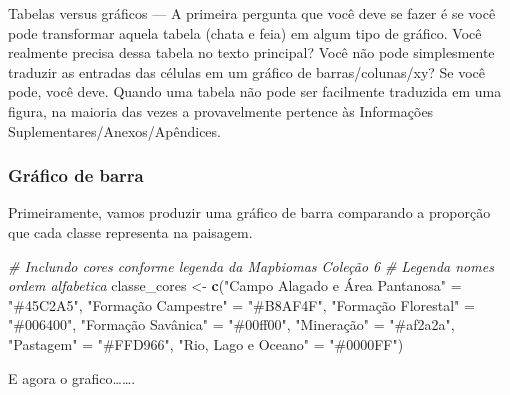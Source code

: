 \documentclass[
]{article}
\newenvironment{Shaded}{\begin{snugshade}}{\end{snugshade}}
\newcommand{\CommentTok}[1]{\textcolor[rgb]{0.56,0.35,0.01}{\textit{#1}}}
\newcommand{\FunctionTok}[1]{\textcolor[rgb]{0.13,0.29,0.53}{\textbf{#1}}}
\newcommand{\NormalTok}[1]{#1}
\newcommand{\OtherTok}[1]{\textcolor[rgb]{0.56,0.35,0.01}{#1}}
\newcommand{\StringTok}[1]{\textcolor[rgb]{0.31,0.60,0.02}{#1}}
\begin{document}
Tabelas versus gráficos --- A primeira pergunta que você deve se fazer
é se você pode transformar aquela tabela (chata e feia) em algum tipo
de gráfico. Você realmente precisa dessa tabela no texto principal?
Você não pode simplesmente traduzir as entradas das células em um
gráfico de barras/colunas/xy? Se você pode, você deve. Quando uma
tabela não pode ser facilmente traduzida em uma figura, na maioria
das vezes a provavelmente pertence às
Informações Suplementares/Anexos/Apêndices.

\hypertarget{gruxe1fico-de-barra}{%
\subsubsection{Gráfico de barra}\label{gruxe1fico-de-barra}}

Primeiramente, vamos produzir uma gráfico de barra comparando a
proporção que cada classe representa na paisagem.

\begin{Shaded}
\begin{Highlighting}[]
\CommentTok{\# Inclundo cores conforme legenda da Mapbiomas Coleção 6}
\CommentTok{\# Legenda nomes ordem alfabetica}
\NormalTok{classe\_cores }\OtherTok{\textless{}{-}} \FunctionTok{c}\NormalTok{(}\StringTok{"Campo Alagado e Área Pantanosa"} \OtherTok{=} \StringTok{"\#45C2A5"}\NormalTok{, }
\StringTok{"Formação Campestre"} \OtherTok{=} \StringTok{"\#B8AF4F"}\NormalTok{, }
\StringTok{"Formação Florestal"} \OtherTok{=} \StringTok{"\#006400"}\NormalTok{, }
\StringTok{"Formação Savânica"} \OtherTok{=} \StringTok{"\#00ff00"}\NormalTok{, }
\StringTok{"Mineração"} \OtherTok{=} \StringTok{"\#af2a2a"}\NormalTok{, }
\StringTok{"Pastagem"} \OtherTok{=} \StringTok{"\#FFD966"}\NormalTok{, }
\StringTok{"Rio, Lago e Oceano"} \OtherTok{=} \StringTok{"\#0000FF"}\NormalTok{) }
\end{Highlighting}
\end{Shaded}

E agora o grafico\ldots\ldots.
\end{document}
